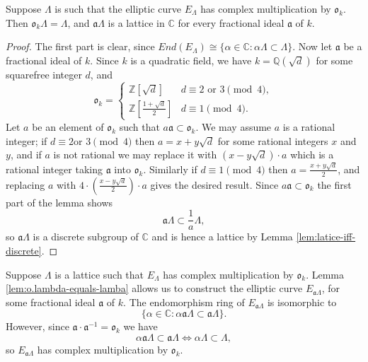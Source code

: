 \begin{lem}
  \label{lem:o.lambda-equals-lamba}
  Suppose $\Lambda$ is such that the elliptic curve $E_{\Lambda}$ has complex
  multiplication by $\mathfrak{o}_{k}$.  Then $\mathfrak{o}_{k}\Lambda = \Lambda$,
  and $\mathfrak{a}\Lambda$ is a lattice in $\mathbb{C}$ for every fractional ideal
  $\mathfrak{a}$ of $k$.
\end{lem}
\begin{proof}
  The first part is clear, since $End(E_{\Lambda}) \cong \{\alpha \in \mathbb{C}
  \colon \alpha\Lambda \subset \Lambda \}$.  Now let $\mathfrak{a}$ be a fractional
  ideal of $k$.  Since $k$ is a quadratic field, we have $k = \mathbb{Q}(\sqrt{d})$
  for some squarefree integer $d$, and
  \begin{equation*}
    \mathfrak{o}_{k} =
    \begin{cases}
      \mathbb{Z}[\sqrt{d}] & d \equiv 2 \text{ or } 3 \pmod{4} ,\\
      \mathbb{Z}[\frac{1 + \sqrt{d}}{2}] & d \equiv 1 \pmod{4}.
    \end{cases}
  \end{equation*}
  Let $a$ be an element of $\mathfrak{o}_{k}$ such that $a\mathfrak{a} \subset
  \mathfrak{o}_{k}$.  We may assume $a$ is a rational integer; if $d \equiv 2 \text{
    or } 3 \pmod{4}$ then $a = x + y\sqrt{d}$ for some rational integers $x$ and $y$,
  and if $a$ is not rational we may replace it with $(x - y\sqrt{d})\cdot a$ which is
  a rational integer taking $\mathfrak{a}$ into $\mathfrak{o}_{k}$.  Similarly if $d
  \equiv 1 \pmod{4}$ then $a = \frac{x + y\sqrt{d}}{2}$, and replacing $a$ with
  $4\cdot (\frac{x - y\sqrt{d}}{2})\cdot a$ gives the desired result.  Since
  $a\mathfrak{a} \subset \mathfrak{o}_{k}$ the first part of the lemma shows
  \begin{equation*}
    \mathfrak{a}\Lambda \subset \frac{1}{a}\Lambda,
  \end{equation*}
  so $\mathfrak{a}\Lambda$ is a discrete subgroup of $\mathbb{C}$ and is hence a
  lattice by Lemma \ref{lem:latice-iff-discrete}.
\end{proof}

Suppose $\Lambda$ is a lattice such that $E_{\Lambda}$ has complex multiplication by
$\mathfrak{o}_{k}$.  Lemma \ref{lem:o.lambda-equals-lamba} allows us to construct the
elliptic curve $E_{\mathfrak{a}\Lambda}$, for some fractional ideal $\mathfrak{a}$ of
$k$.  The endomorphism ring of $E_{\mathfrak{a}\Lambda}$ is isomorphic to
\begin{equation*}
  \{\alpha \in \mathbb{C} : \alpha \mathfrak{a}\Lambda \subset \mathfrak{a}\Lambda \}.
\end{equation*}
However, since $\mathfrak{a} \cdot \mathfrak{a}^{-1} = \mathfrak{o}_{k}$ we have
\begin{equation*}
  \alpha \mathfrak{a}\Lambda \subset \mathfrak{a}\Lambda
  \Leftrightarrow
  \alpha\Lambda \subset \Lambda ,
\end{equation*}
so $E_{\mathfrak{a}\Lambda}$ has complex multiplication by $\mathfrak{o}_{k}$.

